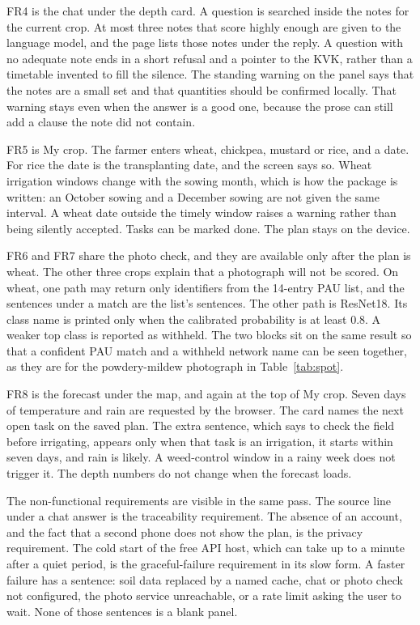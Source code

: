 FR4 is the chat under the depth card. A question is searched inside the notes for the current crop. At most three notes that score highly enough are given to the language model, and the page lists those notes under the reply. A question with no adequate note ends in a short refusal and a pointer to the KVK, rather than a timetable invented to fill the silence. The standing warning on the panel says that the notes are a small set and that quantities should be confirmed locally. That warning stays even when the answer is a good one, because the prose can still add a clause the note did not contain.

FR5 is My crop. The farmer enters wheat, chickpea, mustard or rice, and a date. For rice the date is the transplanting date, and the screen says so. Wheat irrigation windows change with the sowing month, which is how the package is written: an October sowing and a December sowing are not given the same interval. A wheat date outside the timely window raises a warning rather than being silently accepted. Tasks can be marked done. The plan stays on the device.

FR6 and FR7 share the photo check, and they are available only after the plan is wheat. The other three crops explain that a photograph will not be scored. On wheat, one path may return only identifiers from the 14-entry PAU list, and the sentences under a match are the list's sentences. The other path is ResNet18. Its class name is printed only when the calibrated probability is at least 0.8. A weaker top class is reported as withheld. The two blocks sit on the same result so that a confident PAU match and a withheld network name can be seen together, as they are for the powdery-mildew photograph in Table~\ref{tab:spot}.

FR8 is the forecast under the map, and again at the top of My crop. Seven days of temperature and rain are requested by the browser. The card names the next open task on the saved plan. The extra sentence, which says to check the field before irrigating, appears only when that task is an irrigation, it starts within seven days, and rain is likely. A weed-control window in a rainy week does not trigger it. The depth numbers do not change when the forecast loads.

The non-functional requirements are visible in the same pass. The source line under a chat answer is the traceability requirement. The absence of an account, and the fact that a second phone does not show the plan, is the privacy requirement. The cold start of the free API host, which can take up to a minute after a quiet period, is the graceful-failure requirement in its slow form. A faster failure has a sentence: soil data replaced by a named cache, chat or photo check not configured, the photo service unreachable, or a rate limit asking the user to wait. None of those sentences is a blank panel.
